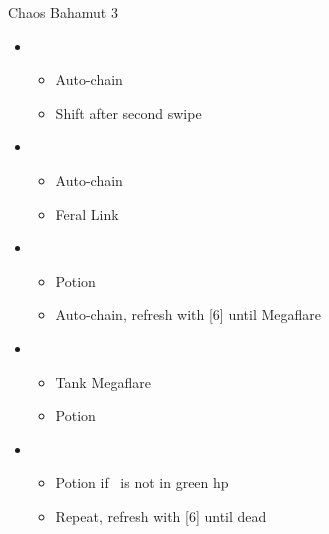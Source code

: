 \begin{battle}{Chaos Bahamut 3}
  \begin{flushleft}
    \begin{itemize}
      \item \sixth
            \begin{itemize}
              \item Auto-chain
              \item Shift after second swipe
            \end{itemize}
      \item \second
            \begin{itemize}
              \item Auto-chain
              \item Feral Link
            \end{itemize}
      \item \sixth
            \begin{itemize}
              \item Potion
              \item Auto-chain, refresh with [6] until Megaflare
            \end{itemize}
      \item \fourth
            \begin{itemize}
              \item Tank Megaflare
              \item Potion
            \end{itemize}
      \item \fifth
            \begin{itemize}
              \item Potion if \chu\ is not in green hp
              \item Repeat, refresh with [6] until dead
            \end{itemize}
    \end{itemize}
  \end{flushleft}
\end{battle}

